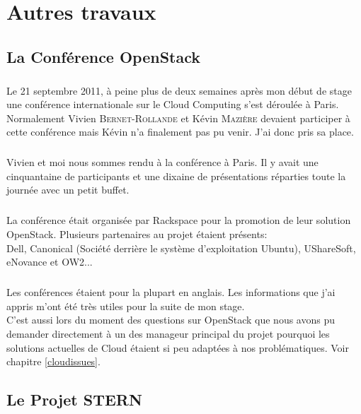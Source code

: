 \chapter{Autres travaux}

\section{La Conférence OpenStack}
\paragraph*{}
Le 21 septembre 2011, à peine plus de deux semaines après mon début de stage une conférence internationale sur le Cloud Computing s'est déroulée à Paris.
Normalement Vivien \textsc{Bernet-Rollande} et Kévin \textsc{Mazière} devaient participer à cette conférence mais Kévin n'a finalement pas pu venir. J'ai donc
 pris sa place.

\paragraph*{}
Vivien et moi nous sommes rendu à la conférence à Paris.
Il y avait une cinquantaine de participants et une dixaine de présentations réparties toute la journée avec un petit buffet.

\paragraph*{}
La conférence était organisée par Rackspace pour la promotion de leur solution OpenStack. Plusieurs partenaires au projet étaient présents:\\
Dell, Canonical (Société derrière le système d'exploitation Ubuntu), UShareSoft, eNovance et OW2...

\paragraph*{}
Les conférences étaient pour la plupart en anglais. Les informations que j'ai appris m'ont été très utiles pour la suite de mon stage.\\
C'est aussi lors du moment des questions sur OpenStack que nous avons pu demander directement à un des manageur principal du projet pourquoi les solutions actuelles de Cloud
étaient si peu adaptées à nos problématiques. Voir chapitre \ref{cloudissues}.


\section{Le Projet STERN}
